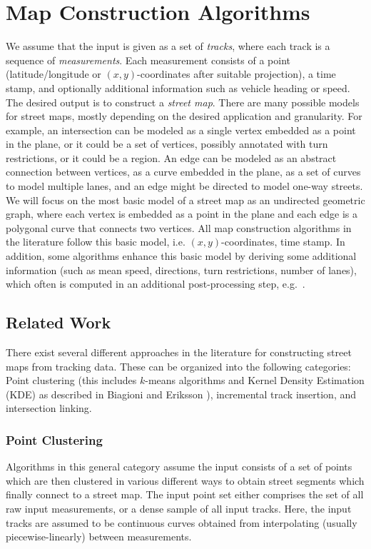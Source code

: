 \documentclass[natbib]{svjour3}                    \smartqed  \usepackage[table]{xcolor}
\begin{document}
\section{Map Construction Algorithms}
\label{sec:sec_mca}

We assume that the input is given as a set of {\em tracks}, where each track is a sequence of {\em measurements}. Each measurement consists of a point (latitude/longitude or $\left(x,y\right)$-coordinates after suitable projection), a time stamp, and optionally additional information such as vehicle heading or speed. The desired output is to construct a {\em street map}. There are many possible models for street maps, mostly depending on the desired application and granularity. For example, an intersection can be modeled as a single vertex embedded as a point in the plane, or it could be a set of vertices, possibly annotated with turn restrictions, or it could be a region. An edge can be modeled as an abstract connection between vertices, as a curve embedded in the plane, as a set of curves to model multiple lanes, and an edge might be directed to model one-way streets. We will focus on the most basic model of a street map as an undirected geometric graph, where each vertex is embedded as a point in the plane and each edge is a polygonal curve that connects two vertices. All map construction algorithms in the literature follow this basic model, i.e. $\left(x,y\right)$-coordinates, time stamp.  In addition, some algorithms enhance this basic model by deriving some additional information (such as mean speed, directions, turn restrictions, number of lanes), which often is computed in an additional post-processing step, e.g.~\cite{Biagioni:2012:MIF:2424321.2424333, Cao:2009:GTR:1653771.1653776, Davies:2006:SDR:1175887.1176088, edelkamp:2003:rpmi, schroedl:2004:mgtm}.

\subsection{Related Work}
There exist several different approaches in the literature for constructing street maps from tracking data. These can be organized into the following categories: Point clustering (this includes $k$-means algorithms and Kernel Density Estimation (KDE) as described in Biagioni and Eriksson \cite{Biagioni:2012:MIF:2424321.2424333}), incremental track insertion, and intersection linking.

\subsubsection{Point Clustering} 
Algorithms in this general category assume the input consists of a set of points which are then clustered in various different ways to obtain street segments which finally connect to a street map. The input point set either comprises the set of all raw input measurements, or a dense sample of all input tracks. Here, the input tracks are assumed to be continuous curves obtained from interpolating (usually piecewise-linearly) between measurements. 
\end{document}
